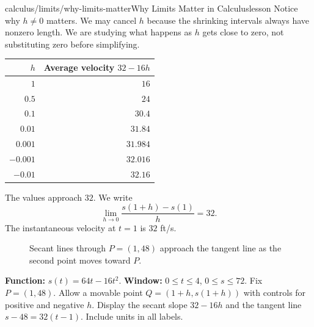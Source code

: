 \documentclass[11pt,openany]{book}
\theoremstyle{bgplain}
\begin{document}
\begin{webpage}{calculus/limits/why-limits-matter}{Why Limits Matter in Calculus}{lesson}
Notice why \(h\ne0\) matters. We may cancel \(h\) because the shrinking intervals always have nonzero length. We are studying what happens as \(h\) gets close to zero, not substituting zero before simplifying.

\begin{center}
\begin{tabular}{@{}r r@{}}
\toprule
\(h\) & Average velocity \(32-16h\)\\
\midrule
\(1\) & \(16\)\\
\(0.5\) & \(24\)\\
\(0.1\) & \(30.4\)\\
\(0.01\) & \(31.84\)\\
\(0.001\) & \(31.984\)\\
\(-0.001\) & \(32.016\)\\
\(-0.01\) & \(32.16\)\\
\bottomrule
\end{tabular}
\end{center}

The values approach \(32\). We write
\[
  \boxed{\lim_{h\to0}\frac{s(1+h)-s(1)}{h}=32}.
\]
The instantaneous velocity at \(t=1\) is \(32\) ft/s.

\begin{figure}[htbp]
\centering
{}
\caption{Secant lines through \(P=(1,48)\) approach the tangent line as the second point moves toward \(P\).}
\label{fig:secants}
\end{figure}

\begin{bggraphspec}
\textbf{Function:} \(s(t)=64t-16t^2\). \textbf{Window:} \(0\le t\le4\), \(0\le s\le72\). Fix \(P=(1,48)\). Allow a movable point \(Q=(1+h,s(1+h))\) with controls for positive and negative \(h\). Display the secant slope \(32-16h\) and the tangent line \(s-48=32(t-1)\). Include units in all labels.
\end{bggraphspec}


\end{webpage}
\end{document}
